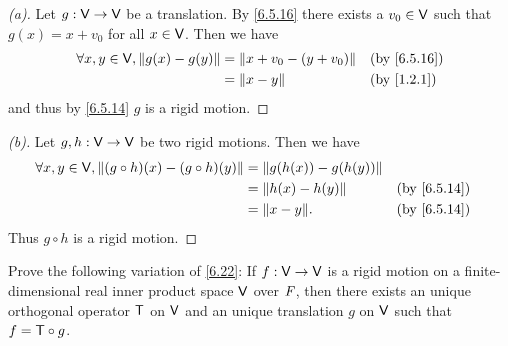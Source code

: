 \begin{proof}[(a)]
  Let \(g : \mathsf{V} \to \mathsf{V}\) be a translation.
  By \cref{6.5.16} there exists a \(v_0 \in \mathsf{V}\) such that \(g(x) = x + v_0\) for all \(x \in \mathsf{V}\).
  Then we have
  \begin{align*}
    \forall x, y \in \V, \norm{g(x) - g(y)} & = \norm{x + v_0 - (y + v_0)} &  & \by{6.5.16} \\
                                            & = \norm{x - y}               &  & \by{1.2.1}
  \end{align*}
  and thus by \cref{6.5.14} \(g\) is a rigid motion.
\end{proof}

\begin{proof}[(b)]
  Let \(g, h: \mathsf{V} \to \mathsf{V}\) be two rigid motions.
  Then we have
  \begin{align*}
    \forall x, y \in \V, \norm{(g \circ h)(x) - (g \circ h)(y)} & = \norm{g(h(x)) - g(h(y))}                  \\
                                                                & = \norm{h(x) - h(y)}       &  & \by{6.5.14} \\
                                                                & = \norm{x - y}.            &  & \by{6.5.14}
  \end{align*}
  Thus \(g \circ h\) is a rigid motion.
\end{proof}

\begin{ex}\label{ex:6.5.23}
  Prove the following variation of \cref{6.22}:
  If \(f : \mathsf{V} \to \mathsf{V}\) is a rigid motion on a finite-dimensional real inner product space \(\mathsf{V}\) over \(\mathit{F}\), then there exists an unique orthogonal operator \(\mathsf{T}\) on \(\mathsf{V}\) and an unique translation \(g\) on \(\mathsf{V}\) such that \(f = \mathsf{T} \circ g\).
\end{ex}

